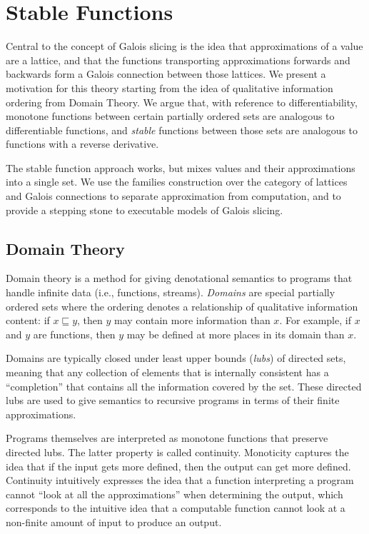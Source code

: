 \section{Stable Functions}
\label{sec:stable-functions}

Central to the concept of Galois slicing is the idea that
approximations of a value are a lattice, and that the functions
transporting approximations forwards and backwards form a Galois
connection between those lattices. We present a motivation for this
theory starting from the idea of qualitative information ordering from
Domain Theory. We argue that, with reference to differentiability,
monotone functions between certain partially ordered sets are
analogous to differentiable functions, and \emph{stable} functions
between those sets are analogous to functions with a reverse
derivative.

The stable function approach works, but mixes values and their
approximations into a single set. We use the families construction
over the category of lattices and Galois connections to separate
approximation from computation, and to provide a stepping stone to
executable models of Galois slicing.

\subsection{Domain Theory}

Domain theory is a method for giving denotational semantics to
programs that handle infinite data (i.e., functions,
streams). \emph{Domains} are special partially ordered sets where the
ordering denotes a relationship of qualitative information content: if
$x \sqsubseteq y$, then $y$ may contain more information than $x$. For
example, if $x$ and $y$ are functions, then $y$ may be defined at more
places in its domain than $x$.

Domains are typically closed under least upper bounds (\emph{lubs}) of
directed sets, meaning that any collection of elements that is
internally consistent has a ``completion'' that contains all the
information covered by the set. These directed lubs are used to give
semantics to recursive programs in terms of their finite
approximations.

Programs themselves are interpreted as monotone functions that
preserve directed lubs. The latter property is called
continuity. Monoticity captures the idea that if the input gets more
defined, then the output can get more defined. Continuity intuitively
expresses the idea that a function interpreting a program cannot
``look at all the approximations'' when determining the output, which
corresponds to the intuitive idea that a computable function cannot
look at a non-finite amount of input to produce an output.

